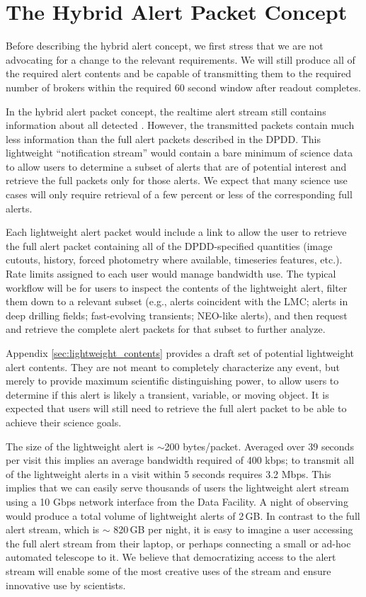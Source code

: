 \documentclass[DM,authoryear,toc]{lsstdoc}
\begin{document}
\section{The Hybrid Alert Packet Concept}

Before describing the hybrid alert concept, we first stress that we are not advocating for a change to the relevant requirements.
We will still produce all of the required alert contents and be capable of transmitting them to the required number of brokers within the required 60 second window after readout completes.

In the hybrid alert packet concept, the realtime alert stream still contains information about all detected \DIASources.
However, the transmitted packets contain much less information than the full alert packets described in the DPDD.
This lightweight ``notification stream'' would contain a bare minimum of science data to allow users to determine a subset of alerts that are of potential interest and retrieve the full packets only for those alerts.
We expect that many science use cases will only require retrieval of a few percent or less of the corresponding full alerts. 

Each lightweight alert packet would include a link to allow the user to retrieve the full alert packet containing all of the DPDD-specified quantities (image cutouts, \DIASource history, forced photometry where available, timeseries features, etc.).
Rate limits assigned to each user would manage bandwidth use.
The typical workflow will be for users to inspect the contents of the lightweight alert, filter them down to a relevant subset (e.g., alerts coincident with the LMC; alerts in deep drilling fields; fast-evolving transients; NEO-like alerts), and then request and retrieve the complete alert packets for that subset to further analyze.

Appendix \ref{sec:lightweight_contents} provides a draft set of potential lightweight alert contents.
They are not meant to completely characterize any event, but merely to provide maximum scientific distinguishing power, to allow users to determine if this alert is likely a transient, variable, or moving object.
It is expected that users will still need to retrieve the full alert packet to be able to achieve their science goals.

The size of the lightweight alert is $\sim$200 bytes/packet. 
Averaged over 39 seconds per visit this implies an average bandwidth required of 400 kbps; to transmit all of the lightweight alerts in a visit within 5 seconds requires 3.2 Mbps.
This implies that we can easily serve thousands of users the lightweight alert stream using a 10 Gbps network interface from the Data Facility.
A night of observing would produce a total volume of lightweight alerts of 2\,GB.
In contrast to the full alert stream, which is $\sim$ 820\,GB per night, it is easy to imagine a user accessing the full alert stream from their laptop, or perhaps connecting a small or ad-hoc automated telescope to it.
We believe that democratizing access to the alert stream will enable some of the most creative uses of the stream and ensure innovative use by scientists.
\end{document}
